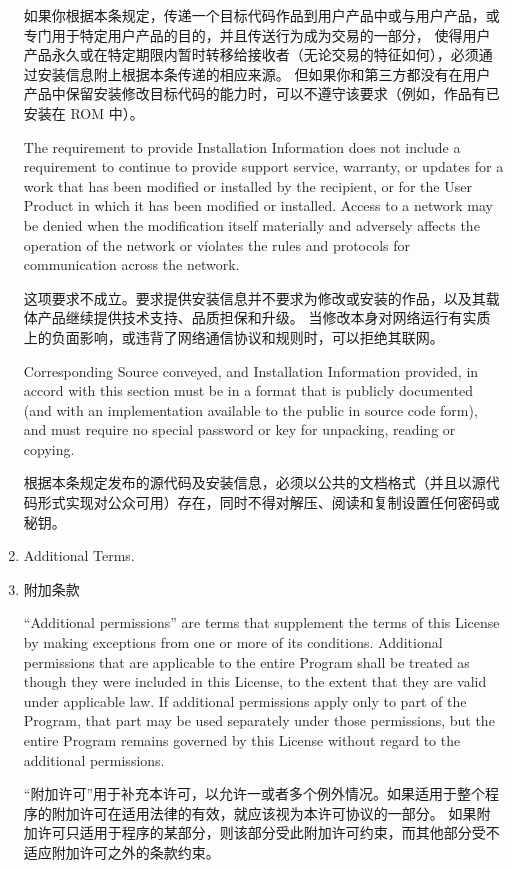 \documentclass[11pt]{article}
\begin{document}
\begin{enumerate}
如果你根据本条规定，传递一个目标代码作品到用户产品中或与用户产品，或专门用于特定用户产品的目的，并且传送行为成为交易的一部分，
使得用户产品永久或在特定期限内暂时转移给接收者（无论交易的特征如何），必须通过安装信息附上根据本条传递的相应来源。 
但如果你和第三方都没有在用户产品中保留安装修改目标代码的能力时，可以不遵守该要求（例如，作品有已安装在 ROM 中）。

The requirement to provide Installation Information does not include a
requirement to continue to provide support service, warranty, or updates
for a work that has been modified or installed by the recipient, or for
the User Product in which it has been modified or installed.  Access to a
network may be denied when the modification itself materially and
adversely affects the operation of the network or violates the rules and
protocols for communication across the network.

这项要求不成立。要求提供安装信息并不要求为修改或安装的作品，以及其载体产品继续提供技术支持、品质担保和升级。
当修改本身对网络运行有实质上的负面影响，或违背了网络通信协议和规则时，可以拒绝其联网。

Corresponding Source conveyed, and Installation Information provided,
in accord with this section must be in a format that is publicly
documented (and with an implementation available to the public in
source code form), and must require no special password or key for
unpacking, reading or copying.

根据本条规定发布的源代码及安装信息，必须以公共的文档格式（并且以源代码形式实现对公众可用）存在，同时不得对解压、阅读和复制设置任何密码或秘钥。

\item Additional Terms.
\item 附加条款

``Additional permissions'' are terms that supplement the terms of this
License by making exceptions from one or more of its conditions.
Additional permissions that are applicable to the entire Program shall
be treated as though they were included in this License, to the extent
that they are valid under applicable law.  If additional permissions
apply only to part of the Program, that part may be used separately
under those permissions, but the entire Program remains governed by
this License without regard to the additional permissions.

“附加许可”用于补充本许可，以允许一或者多个例外情况。如果适用于整个程序的附加许可在适用法律的有效，就应该视为本许可协议的一部分。
如果附加许可只适用于程序的某部分，则该部分受此附加许可约束，而其他部分受不适应附加许可之外的条款约束。


\end{enumerate}
\end{document}
